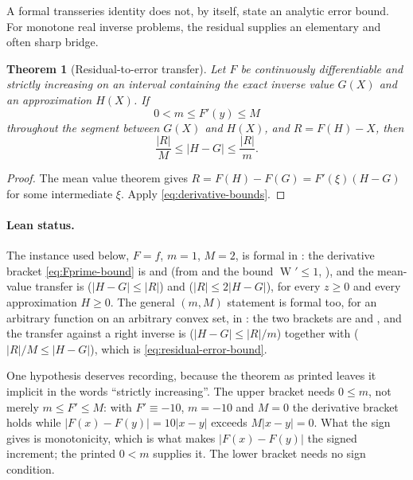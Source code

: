 \documentclass[11pt,oneside]{article}
\theoremstyle{plain}
\newtheorem{theorem}{Theorem}[section]
\theoremstyle{definition}
\theoremstyle{remark}
\newcommand{\W}{\operatorname{W}}
\begin{document}
A formal transseries identity does not, by itself, state an analytic error
bound.  For monotone real inverse problems, the residual supplies an elementary
and often sharp bridge.

\begin{theorem}[Residual-to-error transfer]
\label{thm:residual-general}
Let \(F\) be continuously differentiable and strictly increasing on an interval
containing the exact inverse value \(G(X)\) and an approximation \(H(X)\).  If
\begin{equation}
 0<m\le F'(y)\le M
 \label{eq:derivative-bounds}
\end{equation}
throughout the segment between \(G(X)\) and \(H(X)\), and
\(R=F(H)-X\), then
\begin{equation}
 \frac{|R|}{M}\le |H-G|\le\frac{|R|}{m}.
 \label{eq:residual-error-bound}
\end{equation}
\end{theorem}

\begin{proof}
The mean value theorem gives
\(R=F(H)-F(G)=F'(\xi)(H-G)\) for some intermediate \(\xi\).
Apply \eqref{eq:derivative-bounds}.
\end{proof}

\paragraph{Lean status.}
The instance used below, \(F=f\), \(m=1\), \(M=2\), is formal in
: the derivative bracket \eqref{eq:Fprime-bound} is
 and  (from
 and the bound \(\W'\le1\),
), and the mean-value transfer is
 (\(|H-G|\le|R|\)) and
 (\(|R|\le2|H-G|\)), for every
\(z\ge0\) and every approximation \(H\ge0\).  The general \((m,M)\) statement is formal too, for
an arbitrary function on an arbitrary convex set, in : the two
brackets are  and
, and the transfer against a right inverse is
 (\(|H-G|\le|R|/m\)) together with
 (\(|R|/M\le|H-G|\)), which is
\eqref{eq:residual-error-bound}.

One hypothesis deserves recording, because the theorem as printed leaves it implicit in the
words ``strictly increasing''.  The upper bracket needs \(0\le m\), not merely \(m\le F'\le M\):
with \(F'\equiv-10\), \(m=-10\) and \(M=0\) the derivative bracket holds while
\(\lvert F(x)-F(y)\rvert=10\lvert x-y\rvert\) exceeds \(M\lvert x-y\rvert=0\).  What
the sign gives is monotonicity, which is what makes \(\lvert F(x)-F(y)\rvert\) the signed
increment; the printed \(0<m\) supplies it.  The lower bracket needs no sign condition.
\end{document}
